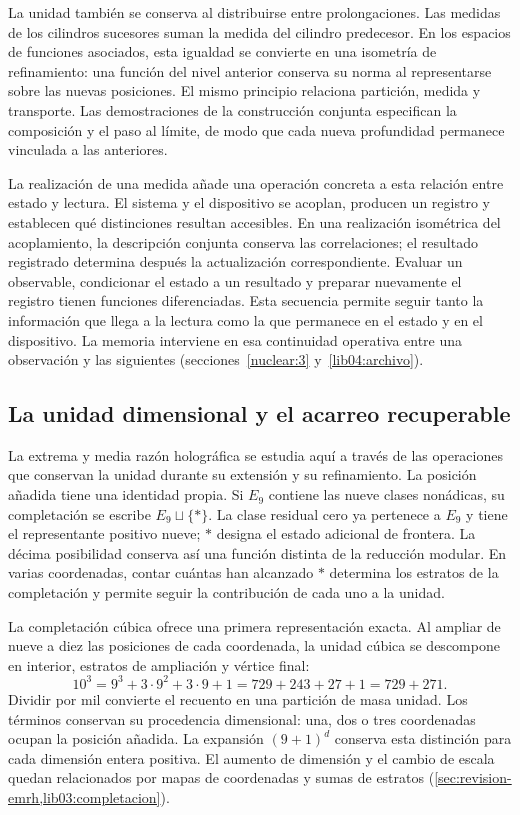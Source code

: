 La unidad también se conserva al distribuirse entre prolongaciones.
Las medidas de los cilindros sucesores suman la medida del cilindro predecesor.
En los espacios de funciones asociados, esta igualdad se convierte en
una isometría de refinamiento: una función del nivel anterior conserva
su norma al representarse sobre las nuevas posiciones. El mismo
principio relaciona partición, medida y transporte. Las demostraciones
de la construcción conjunta especifican la composición y el paso al
límite, de modo que cada nueva profundidad permanece vinculada a las
anteriores.

La realización de una medida añade una operación concreta a esta relación
entre estado y lectura. El sistema y el dispositivo se acoplan, producen
un registro y establecen qué distinciones resultan accesibles. En una
realización isométrica del acoplamiento, la descripción conjunta conserva
las correlaciones; el resultado registrado determina después la
actualización correspondiente. Evaluar un observable, condicionar el
estado a un resultado y preparar nuevamente el registro tienen funciones
diferenciadas. Esta secuencia permite seguir tanto la información que
llega a la lectura como la que permanece en el estado y en el dispositivo.
La memoria interviene en esa continuidad operativa entre una observación
y las siguientes (secciones~\ref{nuclear:3} y~\ref{lib04:archivo}).

\subsection*{La unidad dimensional y el acarreo recuperable}
\label{libnar:unidad}

La extrema y media razón holográfica se estudia aquí a través de las
operaciones que conservan la unidad durante su extensión y su
refinamiento. La posición añadida tiene una identidad propia. Si
\(E_9\) contiene las nueve clases nonádicas, su completación se escribe
\(E_9\sqcup\{\ast\}\). La clase residual cero ya pertenece a
\(E_9\) y tiene el representante positivo nueve; \(\ast\) designa
el estado adicional de frontera. La décima posibilidad conserva así una
función distinta de la reducción modular. En varias coordenadas, contar
cuántas han alcanzado \(\ast\) determina los estratos de la completación
y permite seguir la contribución de cada uno a la unidad.

La completación cúbica ofrece una primera representación
exacta. Al ampliar de nueve a diez las posiciones de cada coordenada,
la unidad cúbica se descompone en interior, estratos de ampliación y
vértice final:
\[
 10^3=9^3+3\cdot9^2+3\cdot9+1
     =729+243+27+1=729+271.
\]
Dividir por mil convierte el recuento en una partición de masa unidad.
Los términos conservan su procedencia dimensional: una, dos o tres
coordenadas ocupan la posición añadida. La expansión
\((9+1)^d\) conserva esta distinción para cada dimensión entera
positiva. El aumento de dimensión y el cambio de escala quedan
relacionados por mapas de coordenadas y sumas de estratos
(\cref{sec:revision-emrh,lib03:completacion}).

